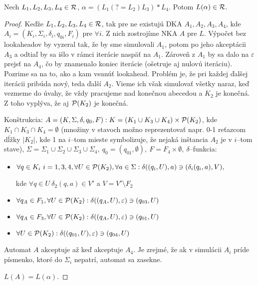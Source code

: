\begin{lema}\label{lookahead s *}
Nech $L_1,L_2,L_3,L_4 \in \R$, $\alpha = \left( L_1 \left( ?=L_2\right) L_3 \right) * L_4$. Potom $L(\alpha) \in \R$.
\end{lema} 
\begin{proof}
Keďže $L_1,L_2,L_3,L_4 \in \R$, tak pre ne existujú DKA $A_1,A_2,A_3,A_4$, kde $A_i = \left( K_i, \Sigma_i, \delta_i, q_{0i}, F_i \right)$ pre $\forall i$. Z nich zostrojíme NKA $A$ pre $L$. Výpočet bez lookaheadov by vyzeral tak, že by sme simulovali $A_1$, potom po jeho akceptácii $A_3$ a odtiaľ by sa išlo v rámci iterácie naspäť na $A_1$. Zároveň z $A_1$ by sa dalo na $\varepsilon$ prejsť na $A_4$, čo by znamenalo koniec iterácie (ošetruje aj nulovú iteráciu). Pozrime sa na to, ako a kam vsunúť lookahead. Problém je, že pri každej ďalšej iterácii pribúda nový, teda ďalší $A_2$. Vieme ich však simulovať všetky naraz, keď vezmeme do úvahy, že vždy pracujeme nad konečnou abecedou a $K_2$ je konečná. Z toho vyplýva, že aj $\P(K_2)$ je konečná.

Konštrukcia: $A = (K,\Sigma ,\delta ,q_0,F) : K = (K_1\cup K_3\cup K_4)\times \P(K_2)$, kde $K_1 \cap K_3 \cap K_4 = \emptyset$ (množiny v stavoch možno reprezentovať napr. 0-1 reťazcom dĺžky $\left\vert{K_2}\right\vert$, kde 1 na $i$--tom mieste symbolizuje, že nejaká inštancia $A_2$ je v $i$--tom stave), $\Sigma = \Sigma_1 \cup \Sigma_2 \cup \Sigma_3 \cup \Sigma_4, ~q_0 = (q_{01},\emptyset ), ~ F = F_4\times \emptyset,~\delta$--funkcia:
 
\begin{itemize}
  \item $\forall q \in K_i~i=1,3,4,\forall U \in \P(K_2),\forall a \in \Sigma : \delta ((q_i,U),a) \ni (\delta _i (q_i,a),V),$
  
  kde $\forall q \in U~\delta_2(q,a) \in V'$ a  $V=V'\setminus F_2$
  \item $\forall q_A \in F_1, \forall U \in \P(K_2) : \delta ((q_A,U),\varepsilon ) \ni (q_{03},U)$
  \item $\forall q_A \in F_3, \forall U \in \P(K_2) : \delta ((q_A,U),\varepsilon ) \ni (q_{01},U)$
  \item $\forall U \in \P(K_2) : \delta ((q_{01},U),\varepsilon ) \ni (q_{04},U)$
\end{itemize}

Automat $A$ akceptuje až keď akceptuje $A_4$. Je zrejmé, že ak v simulácii $A_i$ príde písmenko, ktoré do $\Sigma_i$ nepatrí, automat sa zasekne.

$L(A) = L(\alpha).$


\end{proof}
